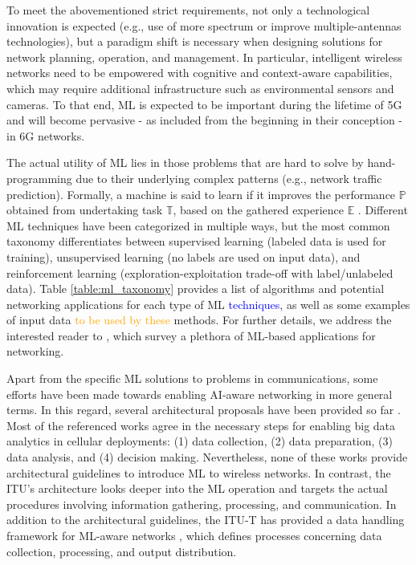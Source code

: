 \documentclass[journal]{IEEEtran}
\begin{document}
To meet the abovementioned strict requirements, not only a technological innovation is expected (e.g., use of more spectrum or improve multiple-antennas technologies), but a paradigm shift is necessary when designing solutions for network planning, operation, and management. In particular, intelligent wireless networks need to be empowered with cognitive and context-aware capabilities, which may require additional infrastructure such as environmental sensors and cameras. To that end, ML is expected to be important during the lifetime of 5G and will become pervasive - as included from the beginning in their conception - in 6G networks. 

The actual utility of ML lies in those problems that are hard to solve by hand-programming due to their underlying complex patterns (e.g., network traffic prediction). Formally, a machine is said to learn if it improves the performance $\mathbb{P}$ obtained from undertaking task $\mathbb{T}$, based on the gathered experience $\mathbb{E}$ \cite{mitchell1997machine}. Different ML techniques have been categorized in multiple ways, but the most common taxonomy differentiates between supervised learning (labeled data is used for training), unsupervised learning (no labels are used on input data), and reinforcement learning (exploration-exploitation trade-off with label/unlabeled data). Table \ref{table:ml_taxonomy} provides a list of algorithms and potential networking applications for each type of ML \textcolor{blue}{techniques}, as well as some examples of input data  \textcolor{orange}{to be used by these} methods. For further details, we address the interested reader to \cite{jiang2016machine, zhang2019deep, usama2019unsupervised}, which survey a plethora of ML-based applications for networking.

Apart from the specific ML solutions to problems in communications, some efforts have been made towards enabling AI-aware networking in more general terms. In this regard, several architectural proposals have been provided so far \cite{bi2015wireless,chih2017big,wang2018machine}. Most of the referenced works agree in the necessary steps for enabling big data analytics in cellular deployments: (1) data collection, (2) data preparation, (3) data analysis, and (4) decision making. Nevertheless, none of these works provide architectural guidelines to introduce ML to wireless networks. In contrast, the ITU's architecture looks deeper into the ML operation and targets the actual procedures involving information gathering, processing, and communication. In addition to the architectural guidelines, the ITU-T has provided a data handling framework for ML-aware networks \cite{itu2019data}, which defines processes concerning data collection, processing, and output distribution. 
\end{document}
